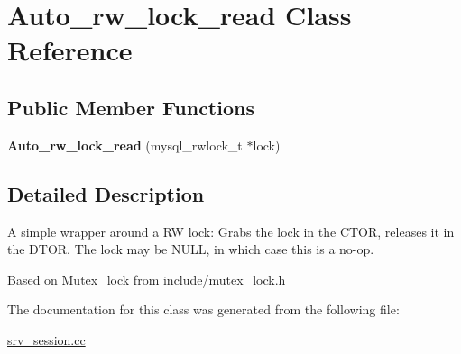 \hypertarget{classAuto__rw__lock__read}{}\section{Auto\+\_\+rw\+\_\+lock\+\_\+read Class Reference}
\label{classAuto__rw__lock__read}
\subsection*{Public Member Functions}
\begin{DoxyCompactItemize}
\item 
\mbox{\label{classAuto__rw__lock__read_a6ad08e2062306b6fdb3596dee43d22fc}} 
{\bfseries Auto\+\_\+rw\+\_\+lock\+\_\+read} (mysql\+\_\+rwlock\+\_\+t $\ast$lock)
\end{DoxyCompactItemize}


\subsection{Detailed Description}
A simple wrapper around a RW lock\+: Grabs the lock in the C\+T\+OR, releases it in the D\+T\+OR. The lock may be N\+U\+LL, in which case this is a no-\/op.

Based on Mutex\+\_\+lock from include/mutex\+\_\+lock.\+h 

The documentation for this class was generated from the following file\+:\begin{DoxyCompactItemize}
\item 
\mbox{\hyperlink{srv__session_8cc}{srv\+\_\+session.\+cc}}\end{DoxyCompactItemize}
